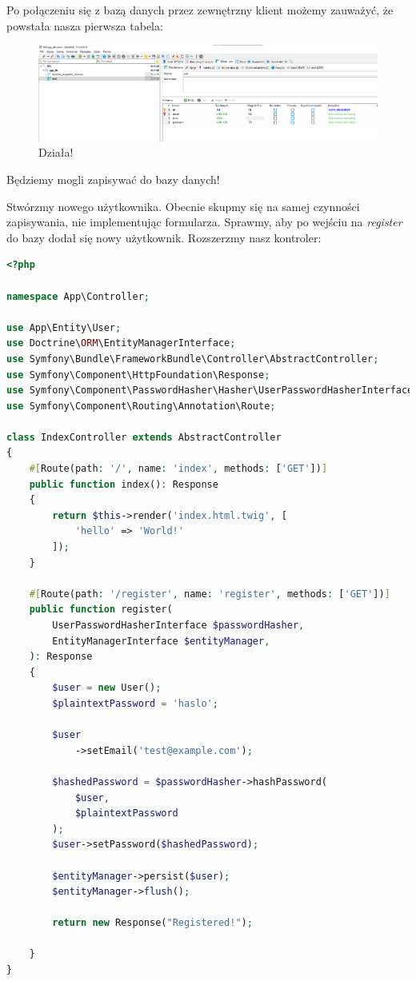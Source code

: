 \documentclass[polish, a4paper]{article}
\begin{document}
Po połączeniu się z bazą danych przez zewnętrzny klient możemy zauważyć, że powstała nasza pierwsza tabela:

\begin{figure}[H]
  \centering
  \includegraphics[width=\textwidth]{tabela.png}
  \caption{Działa!}
\end{figure}

Będziemy mogli zapisywać do bazy danych!

Stwórzmy nowego użytkownika. Obecnie skupmy się na samej czynności zapisywania, nie implementując formularza. Sprawmy, aby po wejściu na \emph{register} do bazy dodał się nowy użytkownik. Rozszerzmy nasz kontroler:

\begin{lstlisting}[language=PHP, caption=Controller/IndexController.php]
<?php

namespace App\Controller;

use App\Entity\User;
use Doctrine\ORM\EntityManagerInterface;
use Symfony\Bundle\FrameworkBundle\Controller\AbstractController;
use Symfony\Component\HttpFoundation\Response;
use Symfony\Component\PasswordHasher\Hasher\UserPasswordHasherInterface;
use Symfony\Component\Routing\Annotation\Route;

class IndexController extends AbstractController
{
    #[Route(path: '/', name: 'index', methods: ['GET'])]
    public function index(): Response
    {
        return $this->render('index.html.twig', [
            'hello' => 'World!'
        ]);
    }

    #[Route(path: '/register', name: 'register', methods: ['GET'])]
    public function register(
        UserPasswordHasherInterface $passwordHasher,
        EntityManagerInterface $entityManager,
    ): Response
    {
        $user = new User();
        $plaintextPassword = 'haslo';

        $user
            ->setEmail('test@example.com');

        $hashedPassword = $passwordHasher->hashPassword(
            $user,
            $plaintextPassword
        );
        $user->setPassword($hashedPassword);

        $entityManager->persist($user);
        $entityManager->flush();

        return new Response("Registered!");

    }
}
\end{lstlisting}
\end{document}
